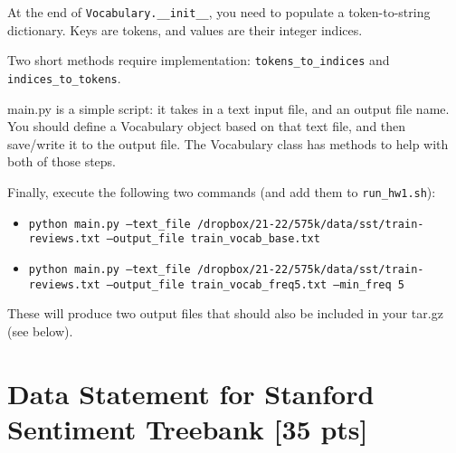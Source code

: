 \documentclass[11pt]{article}
\begin{document}
\vspace{2em}
  At the end of \texttt{Vocabulary.\_\_init\_\_}, you need to populate a token-to-string dictionary.  Keys are tokens, and values are their integer indices.

\vspace{2em}
  Two short methods require implementation: \texttt{tokens\_to\_indices} and \texttt{indices\_to\_tokens}.

\vspace{2em}
  main.py is a simple script: it takes in a text input file, and an output file name.  You should define a Vocabulary object based on that text file, and then save/write it to the output file.  The Vocabulary class has methods to help with both of those steps.

\vspace{2em}
  Finally, execute the following two commands (and add them to \texttt{run\_hw1.sh}):
\begin{itemize}
  \item \texttt{python main.py --text\_file /dropbox/21-22/575k/data/sst/train-reviews.txt --output\_file train\_vocab\_base.txt}
  \item \texttt{python main.py --text\_file /dropbox/21-22/575k/data/sst/train-reviews.txt --output\_file train\_vocab\_freq5.txt --min\_freq 5}
\end{itemize}
These will produce two output files that should also be included in your tar.gz (see below).


\section{Data Statement for Stanford Sentiment Treebank [35 pts]}
\end{document}
